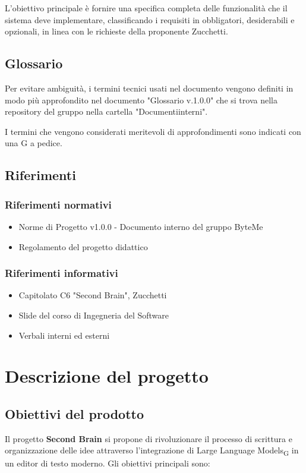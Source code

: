 \documentclass[11pt,a4paper]{article}
\begin{document}
L'obiettivo principale è fornire una specifica completa delle funzionalità che il sistema deve implementare, classificando i requisiti in obbligatori, desiderabili e opzionali, in linea con le richieste della proponente Zucchetti.

\subsection{Glossario}
Per evitare ambiguità, i termini tecnici usati nel documento vengono definiti in modo più approfondito nel documento "Glossario v.1.0.0" che si trova nella repository del gruppo nella cartella "Documenti\textunderscore interni".

I termini che vengono considerati meritevoli di approfondimenti sono indicati con una G a pedice.

\subsection{Riferimenti}
\subsubsection{Riferimenti normativi}
\begin{itemize}
    \item Norme di Progetto v1.0.0 - Documento interno del gruppo ByteMe
    \item Regolamento del progetto didattico
\end{itemize}

\subsubsection{Riferimenti informativi}
\begin{itemize}
    \item Capitolato C6 "Second Brain", Zucchetti
    \item Slide del corso di Ingegneria del Software
    \item Verbali interni ed esterni
\end{itemize}

\newpage

\section{Descrizione del progetto}
\subsection{Obiettivi del prodotto}
Il progetto \textbf{Second Brain} si propone di rivoluzionare il processo di scrittura e organizzazione delle idee attraverso l'integrazione di Large Language Models\textsubscript{G} in un editor di testo moderno. Gli obiettivi principali sono:
\end{document}
